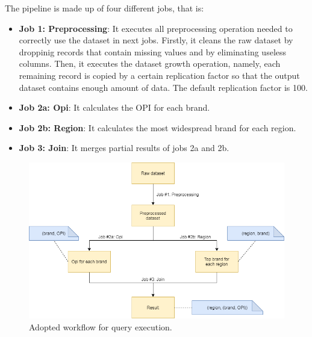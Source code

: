 The pipeline is made up of four different jobs, that is:
\begin{itemize}
  \item \textbf{Job 1: Preprocessing}: It executes all preprocessing operation needed to correctly use the dataset in next jobs. Firstly, it cleans the raw dataset by droppinig records that contain missing values and by eliminating useless columns. Then, it executes the dataset growth operation, namely, each remaining record is copied by a certain replication factor so that the output dataset contains enough amount of data. The default replication factor is 100.  
  \item \textbf{Job 2a: Opi}: It calculates the OPI for each brand.
  \item \textbf{Job 2b: Region}: It calculates the most widespread brand for each region.
  \item \textbf{Job 3: Join}: It merges partial results of jobs 2a and 2b.
\end{itemize}

\begin{figure}[H]
	\centering
	\includegraphics[scale=0.6]{images/2-mapreduce/MR-workflow.png}
	\caption{Adopted workflow for query execution.}
	\label{fig:MR-workflow}
\end{figure}



